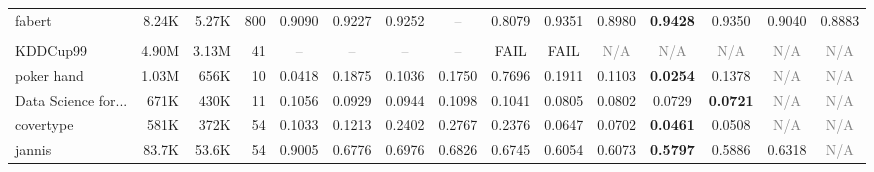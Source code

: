 \begin{table}[t]
{\begin{tabular}{lrrrccccccccccc}
fabert & 8.24K & 5.27K & 800 & \cellcolor[HTML]{ECEECF}0.9090 & \cellcolor[HTML]{E4ECD1}0.9227 & \cellcolor[HTML]{E3ECD1}0.9252 & \textcolor{gray}{--} & \cellcolor[HTML]{F4CCCC}0.8079 & \cellcolor[HTML]{DDEBD2}0.9351 & \cellcolor[HTML]{F2EFCE}0.8980 & \cellcolor[HTML]{D9EAD3}\textbf{0.9428} & \cellcolor[HTML]{DDEBD2}0.9350 & \cellcolor[HTML]{EFEFCF}0.9040 & \cellcolor[HTML]{F8F0CD}0.8883 \\
\addlinespace[2pt]
\rowcolor{gray!15}
\multicolumn{15}{l}{\textbf{Log Loss}} \\
KDDCup99 & 4.90M & 3.13M & 41 & \textcolor{gray}{--} & \textcolor{gray}{--} & \textcolor{gray}{--} & \textcolor{gray}{--} & \textcolor{red!70!black}{FAIL} & \textcolor{red!70!black}{FAIL} & \textcolor{gray}{N/A} & \textcolor{gray}{N/A} & \textcolor{gray}{N/A} & \textcolor{gray}{N/A} & \textcolor{gray}{N/A} \\
poker hand & 1.03M & 656K & 10 & \cellcolor[HTML]{DBEAD3}0.0418 & \cellcolor[HTML]{EAEDD0}0.1875 & \cellcolor[HTML]{E1ECD2}0.1036 & \cellcolor[HTML]{E8EDD0}0.1750 & \cellcolor[HTML]{F4CCCC}0.7696 & \cellcolor[HTML]{EAEED0}0.1911 & \cellcolor[HTML]{E2ECD1}0.1103 & \cellcolor[HTML]{D9EAD3}\textbf{0.0254} & \cellcolor[HTML]{E4ECD1}0.1378 & \textcolor{gray}{N/A} & \textcolor{gray}{N/A} \\
Data Science for... & 671K & 430K & 11 & \cellcolor[HTML]{F6D4CC}0.1056 & \cellcolor[HTML]{FEEECC}0.0929 & \cellcolor[HTML]{FDEBCC}0.0944 & \cellcolor[HTML]{F4CCCC}0.1098 & \cellcolor[HTML]{F7D7CC}0.1041 & \cellcolor[HTML]{EAEED0}0.0805 & \cellcolor[HTML]{E9EDD0}0.0802 & \cellcolor[HTML]{DBEAD3}0.0729 & \cellcolor[HTML]{D9EAD3}\textbf{0.0721} & \textcolor{gray}{N/A} & \textcolor{gray}{N/A} \\
covertype & 581K & 372K & 54 & \cellcolor[HTML]{ECEED0}0.1033 & \cellcolor[HTML]{F2EFCE}0.1213 & \cellcolor[HTML]{F7D8CC}0.2402 & \cellcolor[HTML]{F4CCCC}0.2767 & \cellcolor[HTML]{F8D9CC}0.2376 & \cellcolor[HTML]{DFEBD2}0.0647 & \cellcolor[HTML]{E1ECD2}0.0702 & \cellcolor[HTML]{D9EAD3}\textbf{0.0461} & \cellcolor[HTML]{DBEAD3}0.0508 & \textcolor{gray}{N/A} & \textcolor{gray}{N/A} \\
jannis & 83.7K & 53.6K & 54 & \cellcolor[HTML]{F4CCCC}0.9005 & \cellcolor[HTML]{F0EFCF}0.6776 & \cellcolor[HTML]{F5F0CE}0.6976 & \cellcolor[HTML]{F1EFCF}0.6826 & \cellcolor[HTML]{EFEFCF}0.6745 & \cellcolor[HTML]{DFEBD2}0.6054 & \cellcolor[HTML]{E0EBD2}0.6073 & \cellcolor[HTML]{D9EAD3}\textbf{0.5797} & \cellcolor[HTML]{DBEAD3}0.5886 & \cellcolor[HTML]{E5EDD1}0.6318 & \textcolor{gray}{N/A} \\

\end{tabular}}
\end{table}
